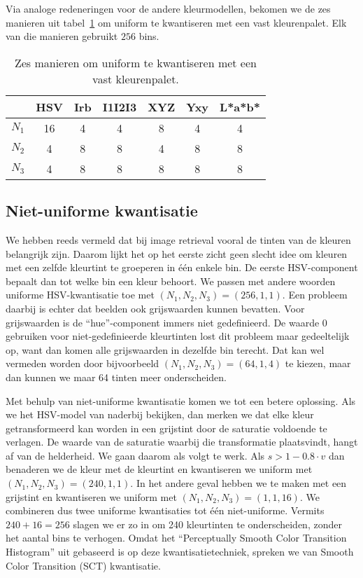 Via analoge redeneringen voor de andere kleurmodellen, bekomen we de zes manieren 
uit tabel~\ref{tab:uniforme_kwantisatie} om uniform te kwantiseren met een vast kleurenpalet.
Elk van die manieren gebruikt $256$ bins.

\begin{table}[tbp]
\begin{center}
\begin{tabular}{|c|cccccc|}
\hline
 		& HSV & Irb & I1I2I3 & XYZ & Yxy & L*a*b* \\
\hline
$N_1$ 	& 16 & 4 & 4 & 8 & 4 & 4 \\
$N_2$	& 4  & 8 & 8 & 4 & 8 & 8 \\
$N_3$	& 4  & 8 & 8 & 8 & 8 & 8 \\
\hline
\end{tabular}
\caption{\label{tab:uniforme_kwantisatie}Zes manieren om uniform te kwantiseren met een vast kleurenpalet.}
\end{center}
\end{table}


\subsection{Niet-uniforme kwantisatie}

We hebben reeds vermeld dat bij image retrieval vooral de tinten van de kleuren belangrijk zijn. Daarom 
lijkt het op het eerste zicht geen slecht idee om kleuren met een zelfde kleurtint te groeperen in 
\'e\'en enkele bin. De eerste HSV-component bepaalt dan tot welke bin een kleur behoort. We passen
met andere woorden uniforme HSV-kwantisatie toe met $(N_1,N_2,N_3)=(256,1,1)$. Een probleem daarbij 
is echter dat beelden ook grijswaarden kunnen bevatten. Voor grijswaarden is de ``hue''-component immers 
niet gedefinieerd. De waarde 0 gebruiken voor niet-gedefinieerde kleurtinten lost dit probleem maar 
gedeeltelijk op, want dan komen alle grijswaarden in dezelfde bin terecht. Dat kan wel vermeden worden 
door bijvoorbeeld $(N_1,N_2,N_3)=(64,1,4)$ te kiezen, maar dan kunnen we maar 64 tinten meer onderscheiden.

Met behulp van niet-uniforme kwantisatie komen we tot een betere oplossing. Als we het HSV-model van naderbij
bekijken, dan merken we dat elke kleur getransformeerd kan worden in een grijstint door de saturatie
voldoende te verlagen. De waarde van de saturatie waarbij die transformatie plaatsvindt, hangt af
van de helderheid. We gaan daarom als volgt te werk. Als $s > 1 - 0.8 \cdot v$ dan benaderen we de kleur
met de kleurtint en kwantiseren we uniform met $(N_1,N_2,N_3)=(240,1,1)$. In het andere geval hebben we
te maken met een grijstint en kwantiseren we uniform met $(N_1,N_2,N_3)=(1,1,16)$. We combineren dus
twee uniforme kwantisaties tot \'e\'en niet-uniforme. Vermits $240 + 16 = 256$
slagen we er zo in om 240 kleurtinten te onderscheiden, zonder het aantal bins te verhogen. Omdat het
``Perceptually Smooth Color Transition Histogram'' uit \cite{sural:perceptually_smooth_histogram} 
gebaseerd is op deze kwantisatietechniek, spreken we van Smooth Color Transition (SCT) kwantisatie.  

